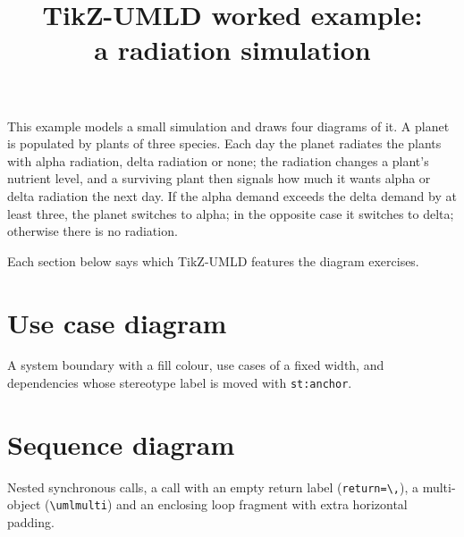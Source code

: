 \documentclass{article}
\title{TikZ-UMLD worked example:\\a radiation simulation}
\author{}
\date{}
\begin{document}
\maketitle

This example models a small simulation and draws four diagrams of it. A
planet is populated by plants of three species. Each day the planet radiates
the plants with alpha radiation, delta radiation or none; the radiation changes
a plant's nutrient level, and a surviving plant then signals how much it
wants alpha or delta radiation the next day. If the alpha demand exceeds the
delta demand by at least three, the planet switches to alpha; in the opposite
case it switches to delta; otherwise there is no radiation.

Each section below says which TikZ-UMLD features the diagram exercises.

\section{Use case diagram}

A system boundary with a fill colour, use cases of a fixed width, and
dependencies whose stereotype label is moved with \texttt{st:anchor}.

\begin{center}
\end{center}

\section{Sequence diagram}

Nested synchronous calls, a call with an empty return label
(\texttt{return=\textbackslash,}), a multi-object (\verb|\umlmulti|) and an
enclosing loop fragment with extra horizontal padding.
\end{document}
